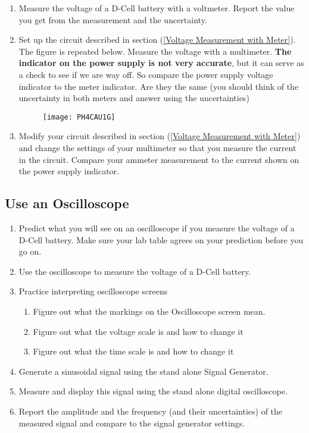 \begin{enumerate}
\item Measure the voltage of a D-Cell battery with a voltmeter. Report the value you get from the measurement and the uncertainty.

\item Set up the circuit described in section (\ref{Voltage Measurement with Meter}). The figure is repeated below. Measure the voltage with a multimeter. \textbf{The indicator on the power supply is not very accurate}, but it can serve as a check to see if we are way off. So compare the power
supply voltage indicator to the meter indicator. Are they the same (you should think of the uncertainty in both meters and answer using the uncertainties)

\begin{figure}[h!]
	\centering
    \texttt{[image: PH4CAU1G]}  
\end{figure}

\item Modify your circuit described in section (\ref{Voltage Measurement with Meter}) and change the settings of your multimeter so that you measure the current in the circuit. Compare your ammeter measurement to the current shown on the power supply indicator.
\end{enumerate}

\subsection{Use an Oscilloscope}

\begin{enumerate}
\item Predict what you will see on an oscilloscope if you measure the voltage of a D-Cell battery. Make sure your lab table agrees on your prediction before you go on.

\item Use the oscilloscope to measure the voltage of a D-Cell battery.

\item Practice interpreting oscilloscope screens

\begin{enumerate}
\item Figure out what the markings on the Oscilloscope screen mean.

\item Figure out what the voltage scale is and how to change it

\item Figure out what the time scale is and how to change it
\end{enumerate}

\item Generate a sinusoidal signal using the stand alone Signal Generator.

\item Measure and display this signal using the stand alone digital
oscilloscope.

\item Report the amplitude and the frequency (and their uncertainties) of
the measured signal and compare to the signal generator settings.
\end{enumerate}

